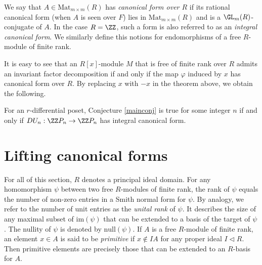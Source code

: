\begin{definition} We say that $ A \in \mathrm{Mat}_{m \times m }(R) $ has \emph{canonical form over $ R $}     if its rational canonical form (when $ A $ is seen over $ F$) lies in $ \mathrm{Mat}_{m \times m }(R) $ and is a $ \GL_{m}(R) $-conjugate of $ A $. In the case $ R = \ZZ $, such a form is also  referred to as an \emph{integral canonical form}.    
We similarly define this notions for endomorphisms of a  free $ R  $-module of finite rank.   \end{definition}                        
It is easy to see that an $ R[x]$-module $ M $ that is free of finite rank over $ R $ admits an invariant factor decomposition if and only if the map $ \varphi $ induced by $ x $  has canonical form over $ R $. By replacing $ x $ with $-x $ in the theorem above, we obtain  the following.                                                                                                                        
\begin{corollary}  \label{RCFEquivMiller}  For  an  $ r $-differential poset, Conjecture \ref{mainconj} is true for some integer  $ n $ if and only if  
$ DU_{n} : \ZZ P_{n} \to \ZZ  P_{n}    $  
has  integral  canonical form.     
\end{corollary}





\section{Lifting canonical forms}  

For all of this section, $  R $ denotes  a  principal ideal domain. For any homomorphism $ \psi $ between two free $R$-modules of finite rank,  the rank of $  \psi $ equals the number of non-zero entries in a Smith normal form for $ \psi $.  By analogy, we refer to the number of unit entries as the  \emph{unital  rank} of $ \psi $. It describes the  size of any maximal subset  of  $ \mathrm{im}(\psi) $ that can be extended to a basis of the target of  $ \psi $. The nullity of $ \psi $ is denoted by $ \mathrm{null}(\psi) $.       %
If $ A $ is a free $R$-module of finite rank, an element $ x \in A $ is said to be \emph{primitive} if $ x \notin IA $ for any proper ideal $ I \triangleleft R $.  Then primitive elements are precisely those that can be extended to an $ R$-basis for   $A $.   

